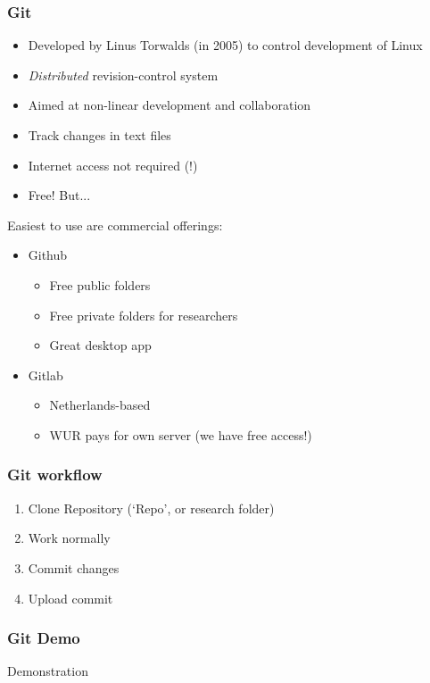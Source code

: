 \documentclass{beamer}
\begin{document}
\begin{frame}[t]\frametitle{Git}
	\begin{itemize}
		\item Developed by Linus Torwalds (in 2005) to control development of Linux
		\item \emph{Distributed} revision-control system
		\item Aimed at non-linear development and collaboration
		\item Track changes in text files
		\item Internet access not required (!)
		\item Free! But...
	\end{itemize}

	Easiest to use are commercial offerings:
		
	\begin{itemize}
		\item Github
		\begin{itemize}
			\item Free public folders
			\item Free private folders for researchers 
			\item Great desktop app
		\end{itemize}
		\item Gitlab
		\begin{itemize}
			\item Netherlands-based
			\item WUR pays for own server (we have free access!)
		\end{itemize}
	\end{itemize}
\end{frame}

\begin{frame}[t]\frametitle{Git workflow}
	\begin{enumerate}
		\item Clone Repository (`Repo', or research folder)
		\item Work normally
		\item Commit changes
		\item Upload commit
	\end{enumerate}
\end{frame}

\begin{frame}[t]\frametitle{Git Demo}
	Demonstration %
\end{frame}
\end{document}
